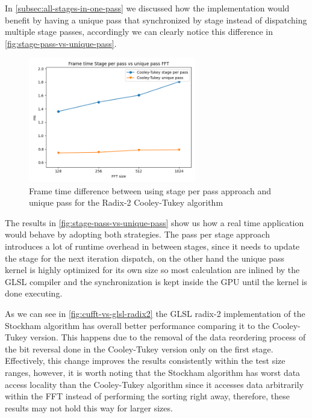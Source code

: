 \documentclass[
  oneside,
  11pt, a4paper,
  footinclude=true,
  headinclude=true,
  cleardoublepage=empty
]{scrbook}
\begin{document}
In \autoref{subsec:all-stages-in-one-pass} we discussed how the implementation would benefit by having a unique pass that synchronized by stage instead of dispatching multiple stage passes, accordingly we can clearly notice this difference in \autoref{fig:stage-pass-vs-unique-pass}.

\begin{figure}[H] 
    \centering
    \includegraphics[width=0.65\textwidth]{img/results/glsl_stage_pass_vs_unique_pass.png}
    \caption{Frame time difference between using stage per pass approach and unique pass for the Radix-2 Cooley-Tukey algorithm}
    \label{fig:stage-pass-vs-unique-pass}
\end{figure}

The results in \autoref{fig:stage-pass-vs-unique-pass} show us how a real time application would behave by adopting both strategies. The pass per stage approach introduces a lot of runtime overhead in between stages, since it needs to update the stage for the next iteration dispatch, on the other hand the unique pass kernel is highly optimized for its own size so most calculation are inlined by the GLSL compiler and the synchronization is kept inside the GPU until the kernel is done executing.
\newline

As we can see in \autoref{fig:cufft-vs-glsl-radix2} the GLSL radix-2 implementation of the Stockham algorithm has overall better performance comparing it to the Cooley-Tukey version. This happens due to the removal of the data reordering process of the bit reversal done in the Cooley-Tukey version only on the first stage. Effectively, this change improves the results consistently within the test size ranges, however, it is worth noting that the Stockham algorithm has worst data access locality than the Cooley-Tukey algorithm since it accesses data arbitrarily within the FFT instead of performing the sorting right away, therefore, these results may not hold this way for larger sizes.
\end{document}
